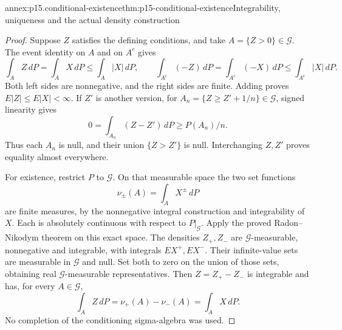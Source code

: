 
\begin{annexitem}{annex:p15.conditional-existence}{thm:p15-conditional-existence}{Integrability, uniqueness and the actual density construction}
\begin{proof}
Suppose \(Z\) satisfies the defining conditions, and take
\(A=\{Z>0\}\in\mathcal G\).
The event identity on \(A\) and on \(A^c\) gives
\[
          \int_A Z\,dP=\int_A X\,dP\leq\int_A|X|\,dP,\qquad
          \int_{A^c}(-Z)\,dP=\int_{A^c}(-X)\,dP
                                      \leq\int_{A^c}|X|\,dP.
\]
Both left sides are nonnegative, and the right sides are finite.
Adding proves \(E|Z|\leq E|X|<\infty\).
If \(Z'\) is another version, for
\(A_n=\{Z\geq Z'+1/n\}\in\mathcal G\), signed linearity gives
\[
                       0=\int_{A_n}(Z-Z')\,dP\geq P(A_n)/n.
\]
Thus each \(A_n\) is null, and their union \(\{Z>Z'\}\) is null.
Interchanging \(Z,Z'\) proves equality almost everywhere.

For existence, restrict \(P\) to \(\mathcal G\). On that measurable
space the two set functions
\[
                       \nu_\pm(A)=\int_A X^\pm\,dP
\]
are finite measures, by the nonnegative integral construction and
integrability of \(X\).
Each is absolutely continuous with respect to \(P|_{\mathcal G}\).
Apply the proved Radon--Nikodym theorem on this exact space.
The densities \(Z_+,Z_-\) are \(\mathcal G\)-measurable, nonnegative
and integrable, with integrals \(EX^+,EX^-\).
Their infinite-value sets are measurable in \(\mathcal G\) and null.
Set both to zero on the union of those sets, obtaining real
\(\mathcal G\)-measurable representatives.
Then \(Z=Z_+-Z_-\) is integrable and has, for every \(A\in\mathcal G\),
\[
                       \int_AZ\,dP=\nu_+(A)-\nu_-(A)=\int_AX\,dP.
\]
No completion of the conditioning sigma-algebra was used.
\end{proof}
\end{annexitem}

